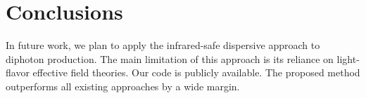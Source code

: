 \section{Conclusions}\label{sec:conclusions}

In future work, we plan to apply the infrared-safe dispersive approach
to diphoton production. The main limitation of this approach is its
reliance on light-flavor effective field theories. Our code is publicly
available. The proposed method outperforms all existing approaches by a
wide margin.

